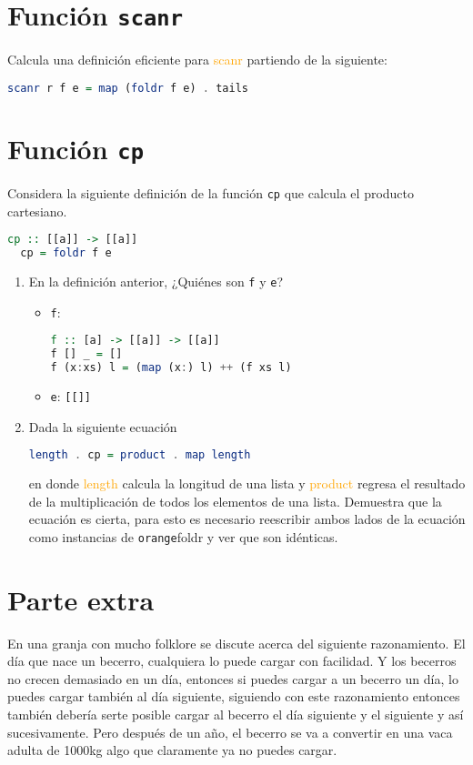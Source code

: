 \documentclass[spanish,12pt,letterpaper]{article}
\begin{document}
\section{Función \texttt{scanr}}
Calcula una definición eficiente para \textcolor{orange}{scanr} partiendo de la
siguiente:

\begin{lstlisting}[language=Haskell]
  scanr r f e = map (foldr f e) . tails
\end{lstlisting}

\section{Función \texttt{cp}}
Considera la siguiente definición de la función \texttt{cp} que calcula el
producto cartesiano.

\begin{lstlisting}[language=Haskell]
  cp :: [[a]] -> [[a]]
  cp = foldr f e
\end{lstlisting}

\begin{enumerate}
\item En la definición anterior, ¿Quiénes son \texttt{f} y \texttt{e}?
\begin{itemize}
\item \texttt{f}:
		\begin{lstlisting}[language=Haskell]
f :: [a] -> [[a]] -> [[a]]
f [] _ = []
f (x:xs) l = (map (x:) l) ++ (f xs l)\end{lstlisting}
\item \texttt{e}: \texttt{[[]]}
\end{itemize}

\item Dada la siguiente ecuación
  \begin{lstlisting}[language=Haskell]
    length . cp = product . map length
  \end{lstlisting}
  en donde \textcolor{orange}{length} calcula la longitud de una lista y
  \textcolor{orange}{product} regresa el resultado de la multiplicación de todos
  los elementos de una lista. Demuestra que la ecuación es cierta, para esto es
  necesario reescribir ambos lados de la ecuación como instancias de \texttt
  {orange}{foldr} y ver que son idénticas.
\end{enumerate}

\section{Parte extra}
En una granja con mucho folklore se discute acerca del siguiente
razonamiento.  El día que nace un becerro, cualquiera lo puede cargar con
facilidad.  Y los becerros no crecen demasiado en un día,  entonces si puedes
cargar a un becerro un día,  lo puedes cargar también al día siguiente,
siguiendo con este razonamiento entonces también debería serte posible cargar al
becerro el día siguiente y el siguiente y así sucesivamente. Pero después de un
año, el becerro se va a convertir en una vaca adulta de 1000kg algo que
claramente ya no puedes cargar.
\end{document}
